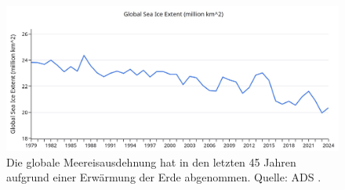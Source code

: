 \documentclass[10pt,twocolumn,letterpaper]{article}
\begin{document}
\begin{figure}[t]
\begin{center}
\includegraphics[width=1\textwidth]{ice.jpg}
\end{center}

   \caption{Die globale Meereisausdehnung hat in den letzten 45 Jahren aufgrund einer Erwärmung der Erde abgenommen. Quelle: ADS \cite{149}.}
\label{fig:24}
\end{figure}

\clearpage
\twocolumn

{\small
\renewcommand{\refname}{References}


}
\end{document}
